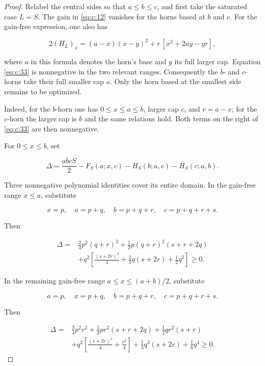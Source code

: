 \begin{proof}
Relabel the central sides so that \(a\le b\le c\), and first take the
saturated case \(L=S\). The gain in \eqref{eq:c:12} vanishes for the horns based at
\(b\) and \(c\). For the gain-free expression, one also has

\begin{equation}
2(H_L)_x=(a-x)(x-y)^2
 +r\,[x^2+2ay-yr],
\label{eq:c:33}
\end{equation}

where \(a\) in this formula denotes the horn's base and \(y\) its full larger
cap. Equation \eqref{eq:c:33} is nonnegative in the two relevant ranges. Consequently
the \(b\)- and \(c\)-horns take their full smaller cap \(a\). Only the horn
based at the smallest side remains to be optimized.

Indeed, for the \(b\)-horn one has \(0\le x\le a\le b\), larger cap \(c\),
and \(r=a-x\); for the \(c\)-horn the larger cap is \(b\) and the same
relations hold. Both terms on the right of \eqref{eq:c:33} are then nonnegative.

For \(0\le x\le b\), set

\begin{equation}
\Delta=\frac{abcS}{2}-F_S(a;x,c)
       -H_S(b;a,c)-H_S(c;a,b).
\label{eq:c:34}
\end{equation}

Three nonnegative polynomial identities cover its entire domain. In the
gain-free range \(x\le a\), substitute

\[
x=p,\quad a=p+q,\quad b=p+q+r,\quad c=p+q+r+s.
\]

Then

\begin{equation}
\begin{aligned}
\Delta={}&\frac34p^2(q+r)^2
 +\frac12p(q+r)^2(s+r+2q)\\
&+q^2\left[\frac{(s+2r)^2}{4}
 +\frac23q(s+2r)+\frac12q^2\right]\ge0.
\end{aligned}
\label{eq:c:35}
\end{equation}

In the remaining gain-free range \(a\le x\le(a+b)/2\), substitute

\[
a=p,\quad x=p+q,\quad b=p+q+r,\quad c=p+q+r+s.
\]

Then

\begin{equation}
\begin{aligned}
\Delta={}&\frac34p^2r^2+\frac12pr^2(s+r+2q)
 +\frac12qr^2(s+r)\\
&+q^2\left[\frac{(s+2r)^2}{4}+\frac{r^2}{4}\right]
 +\frac13q^3(s+2r)+\frac16q^4\ge0.
\end{aligned}
\label{eq:c:36}
\end{equation}


\end{proof}

